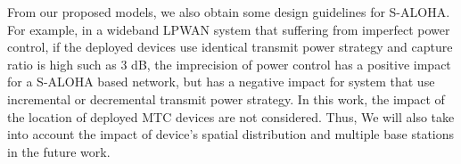From our proposed models, we also obtain some design guidelines for S-ALOHA. For example, in a wideband LPWAN system that suffering from imperfect power control, if the deployed devices use identical transmit power strategy and capture ratio is high such as $3$ dB, the imprecision of power control has a positive impact for a S-ALOHA based network, but has a negative impact for system that use incremental or decremental transmit power strategy. 
%
%
%
In this work, the impact of the location of deployed MTC devices are not considered. Thus, We will also take into account the impact of device's spatial distribution and multiple base stations in the future work.